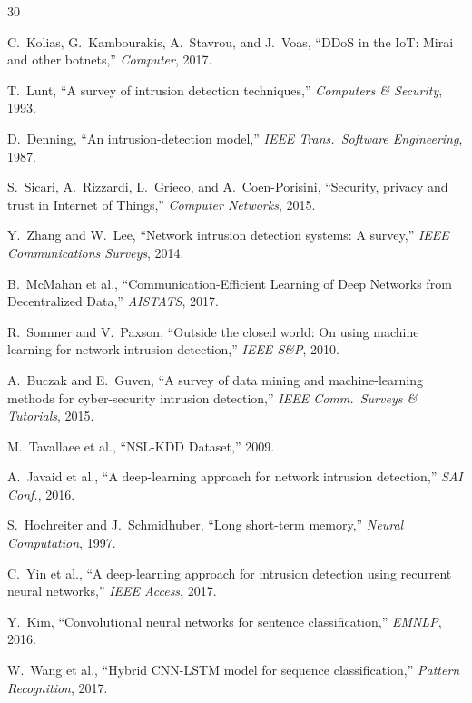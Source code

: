 \documentclass[conference]{IEEEtran}
\begin{document}
\begin{thebibliography}{30}

 C.~Kolias, G.~Kambourakis, A.~Stavrou, and J.~Voas,
``DDoS in the IoT: Mirai and other botnets,''
\emph{Computer}, 2017.

 T.~Lunt, ``A survey of intrusion detection
techniques,'' \emph{Computers \& Security}, 1993.

 D.~Denning, ``An intrusion-detection model,''
\emph{IEEE Trans.\ Software Engineering}, 1987.

 S.~Sicari, A.~Rizzardi, L.~Grieco, and
A.~Coen-Porisini, ``Security, privacy and trust in Internet of
Things,'' \emph{Computer Networks}, 2015.

 Y.~Zhang and W.~Lee, ``Network intrusion detection
systems: A survey,'' \emph{IEEE Communications Surveys}, 2014.

 B.~McMahan et al., ``Communication-Efficient
Learning of Deep Networks from Decentralized Data,''
\emph{AISTATS}, 2017.

 R.~Sommer and V.~Paxson, ``Outside the closed
world: On using machine learning for network intrusion detection,''
\emph{IEEE S\&P}, 2010.

 A.~Buczak and E.~Guven, ``A survey of data mining
and machine-learning methods for cyber-security intrusion detection,''
\emph{IEEE Comm.\ Surveys \& Tutorials}, 2015.

 M.~Tavallaee et al., ``NSL-KDD Dataset,'' 2009.

 A.~Javaid et al., ``A deep-learning approach for
network intrusion detection,'' \emph{SAI Conf.}, 2016.

 S.~Hochreiter and J.~Schmidhuber, ``Long
short-term memory,'' \emph{Neural Computation}, 1997.

 C.~Yin et al., ``A deep-learning approach for
intrusion detection using recurrent neural networks,''
\emph{IEEE Access}, 2017.

 Y.~Kim, ``Convolutional neural networks for sentence
classification,'' \emph{EMNLP}, 2016.

 W.~Wang et al., ``Hybrid CNN-LSTM model for sequence
classification,'' \emph{Pattern Recognition}, 2017.


\end{thebibliography}
\end{document}
